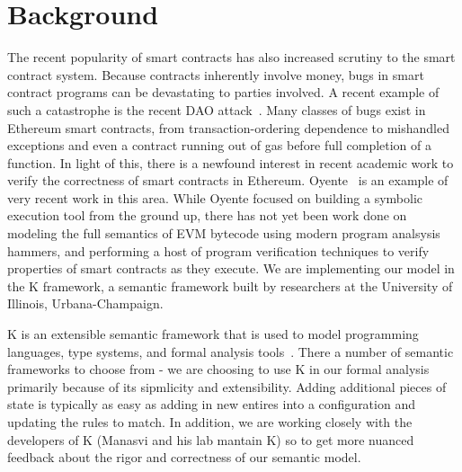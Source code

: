 \section{Background}
The recent popularity of smart contracts has also increased scrutiny to the smart contract system. Because contracts inherently involve money, bugs in smart contract programs can be devastating to parties involved. A recent example of such a catastrophe is the recent DAO attack~\cite{dao-attack}. Many classes of bugs exist in Ethereum smart contracts, from transaction-ordering dependence to mishandled exceptions and even a contract running out of gas before full completion of a function. In light of this, there is a newfound interest in recent academic work to verify the correctness of smart contracts in Ethereum. Oyente~\cite{luumaking} is an example of very recent work in this area. While Oyente focused on building a symbolic execution tool from the ground up, there has not yet been work done on modeling the full semantics of EVM bytecode using modern program analsysis hammers, and performing a host of program verification techniques to verify properties of smart contracts as they execute. We are implementing our model in the K framework, a semantic framework built by researchers at the University of Illinois, Urbana-Champaign.   
 
K is an extensible semantic framework that is used to model programming languages, type systems, and formal analysis tools~\cite{rosu-serbanuta-2010-jlap}. There a number of semantic frameworks to choose from - we are choosing to use K in our formal analysis primarily because of its sipmlicity and extensibility. Adding additional pieces of state is typically as easy as adding in new entires into a configuration and updating the rules to match. In addition, we are working closely with the developers of K (Manasvi and his lab mantain K) so to get more nuanced feedback about the rigor and correctness of our semantic model. 
